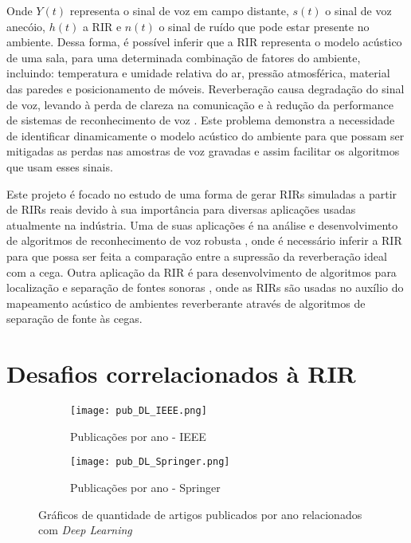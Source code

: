 Onde $Y(t)$ representa o sinal de voz em campo distante, $s(t)$ o sinal de voz anecóio, $h(t)$ a RIR e $n(t)$ o sinal de ruído que pode
estar presente no ambiente.
Dessa forma, é possível inferir que a RIR representa o modelo acústico de uma sala, para uma determinada combinação de fatores do ambiente, incluindo: 
temperatura e umidade relativa do ar, pressão atmosférica, material das paredes e posicionamento de móveis.
Reverberação causa degradação do sinal de voz, levando à perda de clareza na comunicação \cite{Speech_intellig_hear} e à redução da performance
de sistemas de reconhecimento de voz \cite{reverb_sup_speech_reg}. Este problema demonstra a necessidade de identificar dinamicamente o modelo acústico
do ambiente para que possam ser mitigadas as perdas nas amostras de voz gravadas e assim facilitar os algoritmos que usam esses sinais.

Este projeto é focado no estudo de uma forma de gerar RIRs simuladas a partir de RIRs reais devido à sua importância para diversas
aplicações usadas atualmente na indústria. Uma de suas aplicações é na análise e desenvolvimento de algoritmos de 
reconhecimento de voz robusta \cite{reverb_sup_speech_reg}, onde é necessário inferir a RIR para que possa ser feita a comparação entre
a supressão da reverberação ideal com a cega.
Outra aplicação da RIR é para desenvolvimento de algoritmos para localização e separação de fontes sonoras \cite{Source_sep_RIR},
onde as RIRs são usadas no auxílio do mapeamento acústico de ambientes reverberante através de algoritmos de separação de fonte às cegas.

\section{Desafios correlacionados à RIR}

\begin{figure} [H]
    \begin{subfigure}{1\textwidth}
        \centering
        \texttt{[image: pub\_DL\_IEEE.png]}
        \caption{Publicações por ano - IEEE}    
    \end{subfigure}
    \begin{subfigure}{1\textwidth}
        \centering
        \texttt{[image: pub\_DL\_Springer.png]}
        \caption{Publicações por ano - Springer\textregistered}    
    \end{subfigure}
    \caption{Gráficos de quantidade de artigos publicados por ano relacionados com \textit{Deep Learning}}
    \label{fig:pub_DL}
\end{figure}

